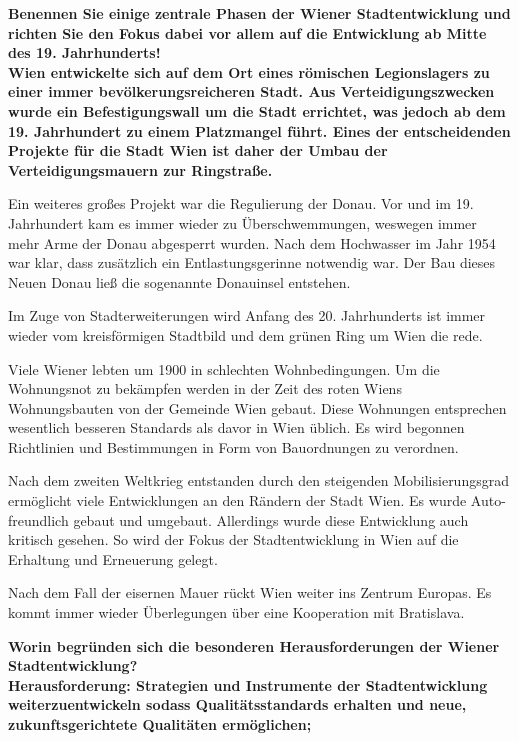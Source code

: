 \documentclass[]{article}
\newenvironment{question}{\vspace{8mm}\noindent\bfseries}{\\}
\begin{document}
\begin{question}
	Benennen Sie einige zentrale Phasen der Wiener Stadtentwicklung und richten Sie den Fokus dabei vor allem auf die Entwicklung ab Mitte des 19. Jahrhunderts!
\end{question}
Wien entwickelte sich auf dem Ort eines römischen Legionslagers zu einer immer bevölkerungsreicheren Stadt. Aus Verteidigungszwecken wurde ein Befestigungswall um die Stadt errichtet, was jedoch ab dem 19. Jahrhundert zu einem Platzmangel führt. Eines der entscheidenden Projekte für die Stadt Wien ist daher der Umbau der Verteidigungsmauern zur Ringstraße.

Ein weiteres großes Projekt war die Regulierung der Donau. Vor und im 19. Jahrhundert kam es immer wieder zu Überschwemmungen, weswegen immer mehr Arme der Donau abgesperrt wurden. Nach dem Hochwasser im Jahr 1954 war klar, dass zusätzlich ein Entlastungsgerinne notwendig war. Der Bau dieses Neuen Donau ließ die sogenannte Donauinsel entstehen.

Im Zuge von Stadterweiterungen wird Anfang des 20. Jahrhunderts ist immer wieder vom kreisförmigen Stadtbild und dem grünen Ring um Wien die rede.

Viele Wiener lebten um 1900 in schlechten Wohnbedingungen. Um die Wohnungsnot zu bekämpfen werden in der Zeit des roten Wiens Wohnungsbauten von der Gemeinde Wien gebaut. Diese Wohnungen entsprechen wesentlich besseren Standards als davor in Wien üblich. Es wird begonnen Richtlinien und Bestimmungen in Form von Bauordnungen zu verordnen.

Nach dem zweiten Weltkrieg entstanden durch den steigenden Mobilisierungsgrad ermöglicht viele Entwicklungen an den Rändern der Stadt Wien. Es wurde Auto-freundlich gebaut und umgebaut. Allerdings wurde diese Entwicklung auch kritisch gesehen. So wird der Fokus der Stadtentwicklung in Wien auf die Erhaltung und Erneuerung gelegt.

Nach dem Fall der eisernen Mauer rückt Wien weiter ins Zentrum Europas. Es kommt immer wieder Überlegungen über eine Kooperation mit Bratislava.

\begin{question}
	Worin begründen sich die besonderen Herausforderungen der Wiener Stadtentwicklung?
\end{question}
Herausforderung: Strategien und Instrumente der Stadtentwicklung weiterzuentwickeln sodass Qualitätsstandards erhalten und neue, zukunftsgerichtete Qualitäten ermöglichen;
\end{document}
